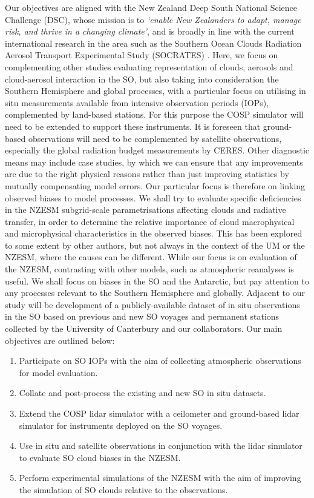 Our objectives are aligned with the New Zealand Deep South National
Science Challenge (DSC), whose mission is to \textit{`enable New Zealanders to adapt,
manage risk, and thrive in a changing climate'}, and is
broadly in line with the current international research in the area
such as the Southern Ocean Clouds
Radiation Aerosol Transport Experimental Study (SOCRATES) \citep{mcfarquhar2014}.
Here, we focus on complementing other studies evaluating
representation of clouds, aerosols and cloud-aerosol interaction in the SO,
but also taking into consideration the Southern Hemisphere and global processes,
with a particular focus on utilising in situ measurements
available from intensive observation periods (IOPs), complemented by land-based
stations. For this
purpose the COSP simulator will need to be extended to support these
instruments. It is foreseen that ground-based observations will need to be
complemented by satellite observations, especially the global radiation budget
measurements by CERES.
Other diagnostic means may include
case studies, by which we can ensure that any improvements are due to
the right physical reasons rather than just improving statistics by mutually
compensating model errors. Our particular focus is therefore on linking
observed biases to model processes. 
We shall try to evaluate specific deficiencies in the NZESM subgrid-scale
parametrisations affecting clouds and radiative transfer, in order to
determine the relative importance of cloud macrophysical and microphysical
characteristics in the observed biases. This has been explored to some extent
by other authors, but not always in the context of the UM or the NZESM,
where the causes can be different.
While our focus is on evaluation of the NZESM, contrasting with other
models, such as atmospheric reanalyses is useful.
We shall focus on biases in the SO and the
Antarctic, but pay attention to any processes relevant to the Southern
Hemisphere and globally.
Adjacent to our study will be development of a publicly-available dataset
of in situ observations in the SO based on previous and new SO voyages
and permanent stations collected by the University of Canterbury and our
collaborators.
Our main objectives are outlined below:

\begin{enumerate}
\item Participate on SO IOPs
with the aim of collecting atmospheric observations for model evaluation.
\item Collate and post-process the existing and new SO in situ datasets.
\item Extend the COSP lidar simulator with a ceilometer and ground-based lidar
simulator for instruments deployed on the SO voyages.
\item Use in situ and satellite observations in conjunction with the lidar simulator
to evaluate SO cloud biases in the NZESM.
\item Perform experimental simulations of the NZESM with the aim of
improving the simulation of SO clouds relative to the observations.
\end{enumerate}

